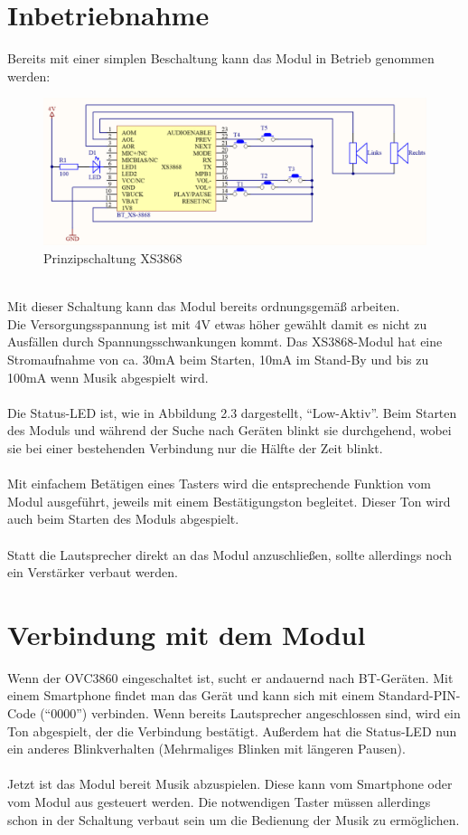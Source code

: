 \section{Inbetriebnahme}
Bereits mit einer simplen Beschaltung kann das Modul in Betrieb genommen werden:
\begin{figure} [h]
	\centering
	\caption{Prinzipschaltung XS3868}
	\includegraphics[width=1\textwidth]{schaltungen/XS3868_Prinzipschaltung}
\end{figure} \\
Mit dieser Schaltung kann das Modul bereits ordnungsgemäß arbeiten.\\
Die Versorgungsspannung ist mit 4V etwas höher gewählt damit es nicht zu Ausfällen durch Spannungsschwankungen kommt. Das XS3868-Modul hat eine Stromaufnahme von ca. 30mA beim Starten, 10mA im Stand-By und bis zu 100mA wenn Musik abgespielt wird.\\ \\
Die Status-LED ist, wie in Abbildung 2.3 dargestellt, \enquote{Low-Aktiv}. Beim Starten des Moduls und während der Suche nach Geräten blinkt sie durchgehend, wobei sie bei einer bestehenden Verbindung nur die Hälfte der Zeit blinkt.\\ \\
Mit einfachem Betätigen eines Tasters wird die entsprechende Funktion vom Modul ausgeführt, jeweils mit einem Bestätigungston begleitet. Dieser Ton wird auch beim Starten des Moduls abgespielt.\\ \\
Statt die Lautsprecher direkt an das Modul anzuschließen, sollte allerdings noch ein Verstärker verbaut werden.
\newpage

\section{Verbindung mit dem Modul}
Wenn der OVC3860 eingeschaltet ist, sucht er andauernd nach BT-Geräten. Mit einem Smartphone findet man das Gerät und kann sich mit einem Standard-PIN-Code (\enquote{0000}) verbinden. Wenn bereits Lautsprecher angeschlossen sind, wird ein Ton abgespielt, der die Verbindung bestätigt. Außerdem hat die Status-LED nun ein anderes Blinkverhalten (Mehrmaliges Blinken mit längeren Pausen).\\ \\
Jetzt ist das Modul bereit Musik abzuspielen. Diese kann vom Smartphone oder vom Modul aus gesteuert werden. Die notwendigen Taster müssen allerdings schon in der Schaltung verbaut sein um die Bedienung der Musik zu ermöglichen.



